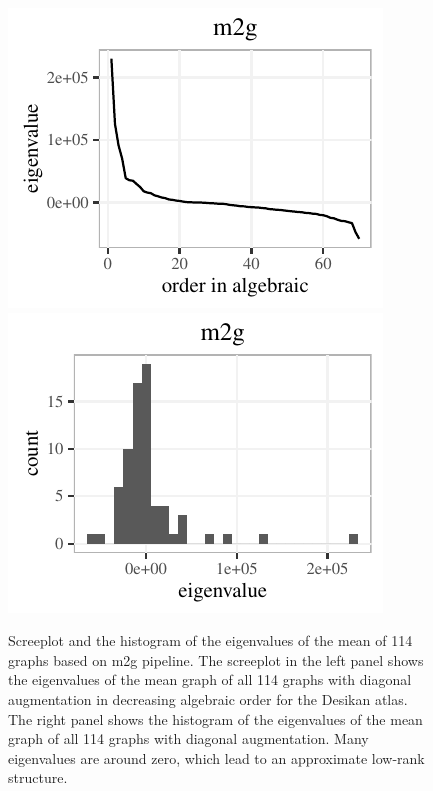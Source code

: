 \documentclass[a4paper]{article}
\begin{document}
\begin{figure}[!htbp]
\centering
\includegraphics[height=.22\textheight]{screeplot_m2g.pdf}
\includegraphics[height=.22\textheight]{hist_m2g.pdf}
\caption{Screeplot and the histogram of the eigenvalues of the  mean of 114 graphs based on m2g pipeline.
The screeplot in the left panel shows the eigenvalues of the mean graph of all 114 graphs with diagonal augmentation in decreasing algebraic order for the Desikan atlas. The right panel shows the histogram of the eigenvalues of the mean graph of all 114 graphs with diagonal augmentation. Many eigenvalues are around zero, which lead to an approximate low-rank structure. 
}
\label{fig:screehist}
\end{figure}
\end{document}
